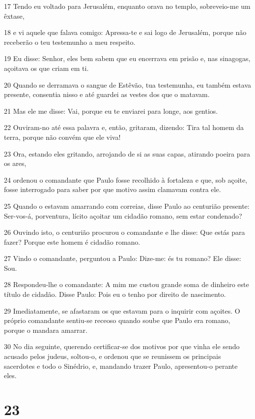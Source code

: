 \par 17 Tendo eu voltado para Jerusalém, enquanto orava no templo, sobreveio-me um êxtase,
\par 18 e vi aquele que falava comigo: Apressa-te e sai logo de Jerusalém, porque não receberão o teu testemunho a meu respeito.
\par 19 Eu disse: Senhor, eles bem sabem que eu encerrava em prisão e, nas sinagogas, açoitava os que criam em ti.
\par 20 Quando se derramava o sangue de Estêvão, tua testemunha, eu também estava presente, consentia nisso e até guardei as vestes dos que o matavam.
\par 21 Mas ele me disse: Vai, porque eu te enviarei para longe, aos gentios.
\par 22 Ouviram-no até essa palavra e, então, gritaram, dizendo: Tira tal homem da terra, porque não convém que ele viva!
\par 23 Ora, estando eles gritando, arrojando de si as suas capas, atirando poeira para os ares,
\par 24 ordenou o comandante que Paulo fosse recolhido à fortaleza e que, sob açoite, fosse interrogado para saber por que motivo assim clamavam contra ele.
\par 25 Quando o estavam amarrando com correias, disse Paulo ao centurião presente: Ser-vos-á, porventura, lícito açoitar um cidadão romano, sem estar condenado?
\par 26 Ouvindo isto, o centurião procurou o comandante e lhe disse: Que estás para fazer? Porque este homem é cidadão romano.
\par 27 Vindo o comandante, perguntou a Paulo: Dize-me: és tu romano? Ele disse: Sou.
\par 28 Respondeu-lhe o comandante: A mim me custou grande soma de dinheiro este título de cidadão. Disse Paulo: Pois eu o tenho por direito de nascimento.
\par 29 Imediatamente, se afastaram os que estavam para o inquirir com açoites. O próprio comandante sentiu-se receoso quando soube que Paulo era romano, porque o mandara amarrar.
\par 30 No dia seguinte, querendo certificar-se dos motivos por que vinha ele sendo acusado pelos judeus, soltou-o, e ordenou que se reunissem os principais sacerdotes e todo o Sinédrio, e, mandando trazer Paulo, apresentou-o perante eles.

\chapter{23}

